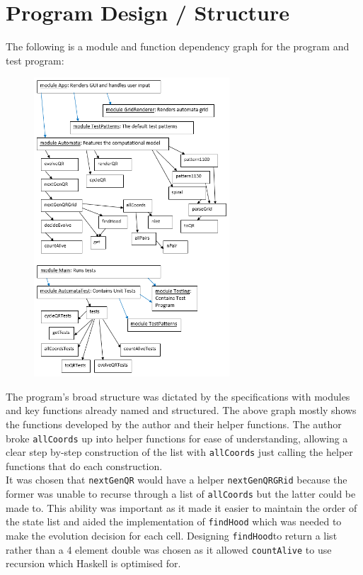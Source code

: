 \documentclass[11pt]{article}
\begin{document}
\section{Program Design / Structure}
The following is a module and function dependency graph for the program and test program: 
  \begin{figure}[H]
    \centering
    \includegraphics[width=0.65\textwidth]{funcDep.png}
  \end{figure}
  \newpage
  The program's broad structure was dictated by the specifications with modules and key functions already named and structured. The above graph mostly shows the functions developed by the author and their helper functions.  The author broke \verb|allCoords| up into helper functions for ease of understanding, allowing a clear step by-step construction of the list with \verb|allCoords| just calling the helper functions that do each construction.\\
  
   It was chosen that \verb|nextGenQR| would have a helper \verb|nextGenQRGRid| because the former was unable to recurse through a list of \verb|allCoords| but the latter could be made to. This ability was important as it made it easier to maintain the order of the state list  and aided the implementation of \verb|findHood| which was needed to make the evolution decision for each cell. Designing \verb|findHood|to return a list rather than a 4 element double was chosen as it allowed \verb|countAlive| to use recursion which Haskell is optimised for.\\
   
\end{document}
